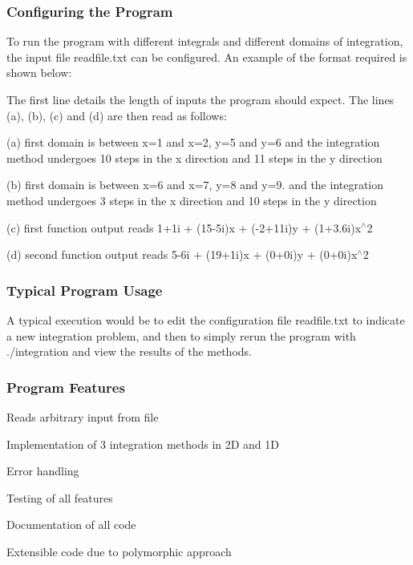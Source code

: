 \subsubsection*{Configuring the Program}

To run the program with different integrals and different domains of integration, the input file {\ttfamily readfile.\+txt} can be configured. An example of the format required is shown below\+:



The first line details the length of inputs the program should expect. The lines (a), (b), (c) and (d) are then read as follows\+:
\begin{DoxyItemize}
\item (a) first domain is between x=1 and x=2, y=5 and y=6 and the integration method undergoes 10 steps in the x direction and 11 steps in the y direction
\item (b) first domain is between x=6 and x=7, y=8 and y=9. and the integration method undergoes 3 steps in the x direction and 10 steps in the y direction
\item (c) first function output reads 1+1i + (15-\/5i)x + (-\/2+11i)y + (1+3.6i)x$^\wedge$2
\item (d) second function output reads 5-\/6i + (19+1i)x + (0+0i)y + (0+0i)x$^\wedge$2
\end{DoxyItemize}

\subsubsection*{Typical Program Usage}

A typical execution would be to edit the configuration file {\ttfamily readfile.\+txt} to indicate a new integration problem, and then to simply rerun the program with {\ttfamily ./integration} and view the results of the methods.

\subsubsection*{Program Features}


\begin{DoxyItemize}
\item Reads arbitrary input from file
\item Implementation of 3 integration methods in 2D and 1D
\item Error handling
\item Testing of all features
\item Documentation of all code
\item Extensible code due to polymorphic approach
\end{DoxyItemize}

